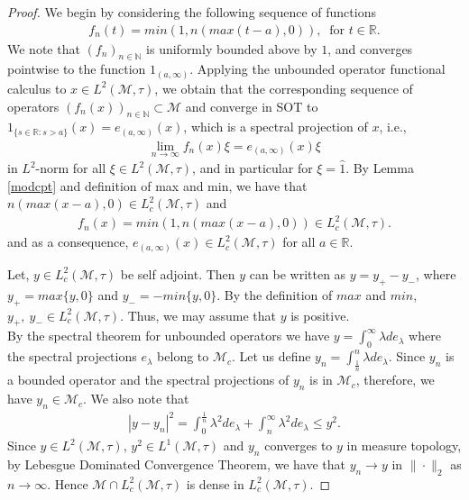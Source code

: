 \documentclass[11pt]{amsart}
\theoremstyle{definition}
\theoremstyle{myremark}
\numberwithin{equation}{section}
\def\R{\mathbb R}
\newcommand{\CM}{\mathcal{M}}
\begin{document}
\begin{proof}
We begin by considering the following  sequence of functions
\begin{align*}
f_{n}(t)=min(1,n(max(t-a),0)), ~ \text{ for } t \in \R.
\end{align*}
We note that $(f_{n})_{n\in\mathbb{N}}$ is uniformly bounded above by $1$, and converges pointwise to the function $1_{(a, \infty )}.$ Applying the unbounded operator functional calculus to $x\in L^{2}(\CM,\tau)$, we obtain that the corresponding sequence of operators $(f_{n}(x))_{n \in \mathbb{N}} \subset \CM$ and converge in SOT to $1_{\{s \in \mathbb{R}:s > a\}}(x)=e_{(a,\infty)}(x)$, which is a spectral projection of $x$, i.e.,
\begin{align*}
    \lim_{n \rightarrow \infty}f_{n}(x)\xi= e_{(a,\infty)}(x)\xi
\end{align*}
in $L^{2}$-norm for all $\xi \in L^{2}(\CM, \tau)$, and in particular for $\xi=\widehat{1}$.
By Lemma \ref{modcpt} and definition of max and min, we have that $n(max(x-a),0) \in L^{2}_{c}(\CM,\tau)$ and
\begin{align*}    
f_{n}(x)=min(1,n(max(x-a),0)) \in L^{2}_{c}(\CM,\tau).
\end{align*}
and as a consequence, $e_{(a,\infty)}(x) \in L_c^{2}(\CM,\tau)$ for all $a \in \mathbb{R}$.

\medskip
\noindent Let, $y\in L^2_c(\CM,\tau)$ be self adjoint.
Then $y$ can be written as  $y=y_+-y_-$,   where $y_+=max\{y,0\}$ and $y_-=-min\{y,0\}$. By the definition of $max$ and $min$, $y_+,~y_- \in L^2_c(\CM,\tau)$. Thus, we may assume that $y$ is positive.\\
By the spectral theorem for unbounded operators we have $y=\int_0^\infty \lambda de_\lambda$ where the spectral projections $e_\lambda$ belong to $\CM_c$. 
Let us define $y_n=\int_{\frac{1}{n}}^n\lambda de_\lambda$. Since $y_n$ is a bounded operator and the spectral projections of $y_n$ is in $\CM_c$, therefore, we have  $y_n\in \CM_c$. We also note that 
\begin{align*}
    |y-y_n|^2=\int_0^{\frac{1}{n}} \lambda^2 de_\lambda + \int_n^\infty \lambda^2 de_\lambda \leq y^2.
\end{align*}
Since  $y\in L^2(\CM, \tau)$, $y^2 \in L^1(\CM,\tau)$ and $y_n$ converges to $y$ in measure topology, by Lebesgue Dominated Convergence Theorem, we have that $y_n\to y$ in $\|\cdot\|_2$ as $n \rightarrow \infty$. Hence $\CM \cap L^2_c(\CM, \tau)$ is dense in $L^2_c(\CM, \tau).$
\end{proof}
\end{document}
